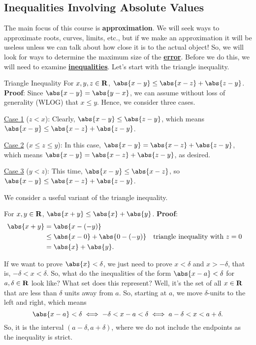 \subsection{Inequalities Involving Absolute Values}
The main focus of this course is \textbf{approximation}. We will seek ways to approximate
roots, curves, limits, etc., but if we make an approximation it will be useless unless we can talk
about how close it is to the actual object! So, we will look for ways to determine the maximum
size of the \underline{\textbf{error}}. Before we do this, we will need to examine \underline{\textbf{inequalities}}.
Let's start with the triangle inequality.
\begin{Theorem}{Triangle Inequality}{}
    For $ x,y,z\in\mathbf{R} $, $ \abs{x-y}\le \abs{x-z}+\abs{z-y} $.
    \tcblower{}
    \textbf{Proof}:
    Since $ \abs{x-y}=\abs{y-x} $, we can assume without loss of generality (WLOG) that $ x\le y $.
    Hence, we consider three cases.

    \underline{Case 1} ($ z<x $): Clearly, $ \abs{x-y}\le \abs{z-y} $, which means
    $ \abs{x-y}\le \abs{x-z}+\abs{z-y} $.

    \underline{Case 2} ($ x\le z\le y $): In this case, $ \abs{x-y}=\abs{x-z}+\abs{z-y} $, which means
    $ \abs{x-y}=\abs{x-z}+\abs{z-y} $, as desired.

    \underline{Case 3} ($ y<z $): This time, $ \abs{x-y}\le \abs{x-z} $, so $ \abs{x-y}\le \abs{x-z}+\abs{z-y} $.
\end{Theorem}
We consider a useful variant of the triangle inequality.
\begin{Corollary}{}{}
    For $ x,y\in\mathbf{R} $, $ \abs{x+y}\le \abs{x}+\abs{y} $.
    \tcblower{}
    \textbf{Proof}:
    \begin{align*}
        \abs{x+y}
         & =\abs{x-(-y)}                                                           \\
         & \le \abs{x-0}+\abs{0-(-y)} &  & \text{triangle inequality with $ z=0 $} \\
         & =\abs{x}+\abs{y}.
    \end{align*}
\end{Corollary}
If we want to prove $ \abs{x}<\delta $, we just need to prove $ x<\delta $ and $ x>-\delta $, that is,
$ -\delta<x<\delta $. So, what do the inequalities of the form $ \abs{x-a}<\delta $ for
$ a,\delta\in\mathbf{R} $ look like? What set does this represent? Well, it's the set of all
$ x\in\mathbf{R} $ that are less than $ \delta $ units away from $ a $. So, starting at $ a $,
we move $ \delta $-units to the left and right, which means
\[ \abs{x-a}<\delta\iff -\delta<x-a<\delta\iff a-\delta<x<a+\delta. \]
So, it is the interval $ (a-\delta,a+\delta) $, where we do not include the endpoints as the inequality is strict.

